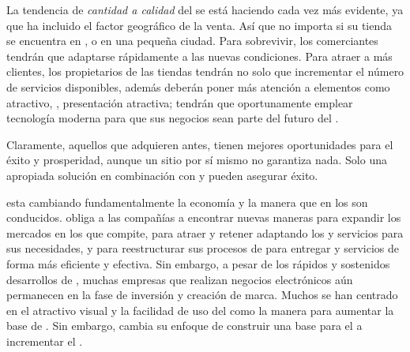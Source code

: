 La tendencia de \textit{cantidad a calidad} del \ecommerceCOM se está haciendo cada vez más evidente, ya que \internetINT ha incluido el factor geográfico de la venta. Así que no importa si su tienda se encuentra en \newYorkNAME, \londresNAME o en una pequeña ciudad. Para sobrevivir, los comerciantes tendrán que adaptarse rápidamente a las nuevas condiciones. Para atraer a más clientes, los propietarios de las tiendas \online tendrán no solo que incrementar el número de servicios disponibles, además deberán poner más atención a elementos como \designQA atractivo, \userfriendliness, presentación atractiva; tendrán que oportunamente emplear tecnología moderna para que sus negocios sean parte del futuro del \ecommerceCOM.

Claramente, aquellos que adquieren \estores antes, tienen mejores oportunidades  para el éxito y prosperidad, aunque un sitio \ecommerceCOM por sí mismo no garantiza nada. Solo una apropiada solución \ecommerceCOM en combinación con \emarketing y \advertising pueden asegurar éxito.

\ecommerceCOM esta cambiando fundamentalmente la economía y la manera que en los \businessCOM son conducidos. \ecommerceCOM obliga a las compañías a encontrar nuevas maneras para expandir los mercados en los que compite, para atraer y retener \customersCOM adaptando los \itemsCOM y servicios para sus necesidades, y para reestructurar sus procesos de \businessCOM para entregar \itemsCOM y servicios de forma más eficiente y efectiva. Sin embargo, a pesar de los rápidos y sostenidos desarrollos de \ecommerceCOM, muchas empresas que realizan negocios electrónicos aún permanecen en la fase de inversión y creación de marca. Muchos \ebusinessCOM se han centrado en el atractivo visual y la facilidad de uso del \websiteINT como la manera para aumentar la base de \customersCOM. Sin embargo, \ebusinessCOM cambia su enfoque de construir una base para el \customerCOM a incrementar el  \cite{shin2001strategies}.

